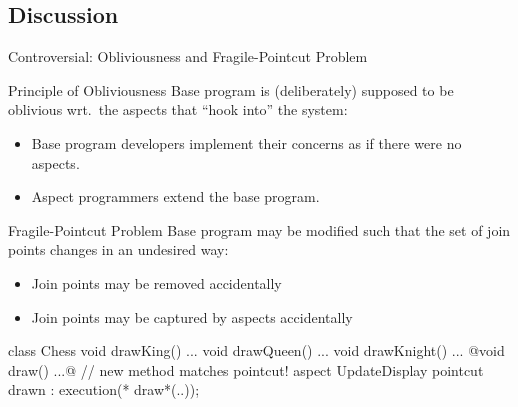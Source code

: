 \subsection{Discussion}

\begin{frame}[fragile]{Controversial: Obliviousness and Fragile-Pointcut Problem}
	\begin{mycolumns}[widths={45}]
		\begin{definition}{Principle of Obliviousness}
			Base program is (deliberately) supposed to be oblivious wrt.\ the aspects that ``hook into'' the system:
			\begin{itemize}
				\item Base program developers implement their concerns as if there were no aspects.
				\item Aspect programmers extend the base program.
			\end{itemize}
		\end{definition}
	\mynextcolumn
		\begin{definition}{Fragile-Pointcut Problem}
			Base program may be modified such that the set of join points changes in an undesired way:
			\begin{itemize}
				\item Join points may be removed accidentally 
				\item Join points may be captured by aspects accidentally
			\end{itemize}
		\end{definition}
		\begin{codetight}{}
class Chess {
	void drawKing() {...}
	void drawQueen() {...}
	void drawKnight() {...}
	@void draw() {...}@ // new method matches pointcut!
}
aspect UpdateDisplay {
	pointcut drawn : execution(* draw*(..));
}
		\end{codetight}
	\end{mycolumns}
\end{frame}


